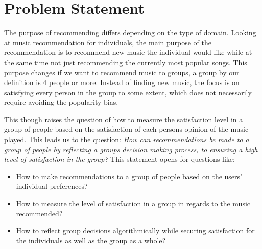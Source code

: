 \section{Problem Statement}
The purpose of recommending differs depending on the type of domain. Looking at music recommendation for individuals, the main purpose of the recommendation is to recommend new music the individual would like while at the same time not just recommending the currently most popular songs. This purpose changes if we want to recommend music to groups, a group by our definition is 4 people or more. Instead of finding new music, the focus is on satisfying every person in the group to some extent, which does not necessarily require avoiding the popularity bias. 

This though raises the question of how to measure the satisfaction level in a group of people based on the satisfaction of each persons opinion of the music played. This leads us to the question:
\textit{How can recommendations be made to a group of people by reflecting a groups decision making process, to ensuring a high level of satisfaction in the group?} This statement opens for questions like:
\begin{itemize}
\item How to make recommendations to a group of people based on the users' individual preferences?
\item How to measure the level of satisfaction in a group in regards to the music recommended?
\item How to reflect group decisions algorithmically while securing satisfaction for the individuals as well as the group as a whole?
\end{itemize}